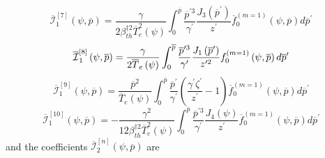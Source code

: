 \begin{equation}
\overline{\mathcal{I}}_{1}^{\left[ 7\right] }\left( \psi ,\overline{p}%
\right) =\frac{\gamma }{2\beta _{th}^{\dag 2}\overline{T}_{e}^{2}\left( \psi
\right) }\int_{0}^{\overline{p}}\frac{\overline{p}^{\prime 3}}{\gamma
^{\prime }}\frac{J_{3}\left( \overline{p}^{\prime }\right) }{z^{\prime }}%
\overline{f}_{0}^{\left( m=1\right) }\left( \psi ,\overline{p}\right) d%
\overline{p}^{\prime }
\end{equation}
\begin{equation}
\overline{\mathcal{I}}_{1}^{\left[ 8\right] }\left( \psi ,\overline{p}%
\right) =\frac{\gamma }{2\overline{T}_{e}\left( \psi \right) }\int_{0}^{%
\overline{p}}\frac{\overline{p}^{\prime 3}}{\gamma ^{\prime }}\frac{%
J_{1}\left( \overline{p}^{\prime }\right) }{z^{\prime 2}}f_{0}^{\left(
m=1\right) }\left( \psi ,\overline{p}\right) d\overline{p}^{\prime }
\end{equation}
\begin{equation}
\overline{\mathcal{I}}_{1}^{\left[ 9\right] }\left( \psi ,\overline{p}%
\right) =\frac{\overline{p}^{2}}{\overline{T}_{e}\left( \psi \right) }%
\int_{0}^{\overline{p}}\frac{\overline{p}^{\prime }}{\gamma ^{\prime }}%
\left( \frac{\gamma ^{\prime }\zeta ^{\prime }}{z^{\prime }}-1\right)
\overline{f}_{0}^{\left( m=1\right) }\left( \psi ,\overline{p}\right) d%
\overline{p}^{\prime }
\end{equation}
\begin{equation}
\overline{\mathcal{I}}_{1}^{\left[ 10\right] }\left( \psi ,\overline{p}%
\right) =-\frac{\gamma ^{2}}{12\beta _{th}^{\dag 2}\overline{T}
_{e}^{2}\left( \psi \right) }\int_{0}^{\overline{p}}\frac{\overline{p}%
^{\prime 3}}{\gamma ^{\prime }}\frac{J_{4}\left( \psi \right) }{z^{\prime }}%
\overline{f}_{0}^{\left( m=1\right) }\left( \psi ,\overline{p}\right) d%
\overline{p}^{\prime }
\end{equation}
and the coefficients $\overline{\mathcal{I}}_{2}^{\left[ n\right] }\left(
\psi ,\overline{p}\right) $ are

